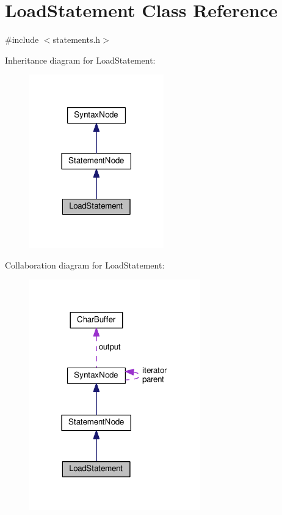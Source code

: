 \hypertarget{classLoadStatement}{}\section{Load\+Statement Class Reference}
\label{classLoadStatement}


{\ttfamily \#include $<$statements.\+h$>$}



Inheritance diagram for Load\+Statement\+:\nopagebreak
\begin{figure}[H]
\begin{center}
\leavevmode
\includegraphics[width=165pt]{classLoadStatement__inherit__graph}
\end{center}
\end{figure}


Collaboration diagram for Load\+Statement\+:\nopagebreak
\begin{figure}[H]
\begin{center}
\leavevmode
\includegraphics[width=210pt]{classLoadStatement__coll__graph}
\end{center}
\end{figure}
